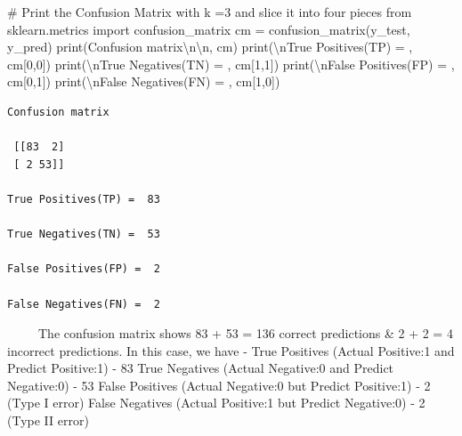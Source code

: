 \documentclass[
  letterpaper,
  DIV=11,
  numbers=noendperiod]{scrreprt}
\newenvironment{Shaded}{\begin{snugshade}}{\end{snugshade}}
\newcommand{\BuiltInTok}[1]{\textcolor[rgb]{0.00,0.23,0.31}{#1}}
\newcommand{\CharTok}[1]{\textcolor[rgb]{0.13,0.47,0.30}{#1}}
\newcommand{\CommentTok}[1]{\textcolor[rgb]{0.37,0.37,0.37}{#1}}
\newcommand{\DecValTok}[1]{\textcolor[rgb]{0.68,0.00,0.00}{#1}}
\newcommand{\ImportTok}[1]{\textcolor[rgb]{0.00,0.46,0.62}{#1}}
\newcommand{\NormalTok}[1]{\textcolor[rgb]{0.00,0.23,0.31}{#1}}
\newcommand{\OperatorTok}[1]{\textcolor[rgb]{0.37,0.37,0.37}{#1}}
\newcommand{\StringTok}[1]{\textcolor[rgb]{0.13,0.47,0.30}{#1}}
\begin{document}
\begin{Shaded}
\begin{Highlighting}[]
\CommentTok{\# Print the Confusion Matrix with k =3 and slice it into four pieces}
\ImportTok{from}\NormalTok{ sklearn.metrics }\ImportTok{import}\NormalTok{ confusion\_matrix}
\NormalTok{cm }\OperatorTok{=}\NormalTok{ confusion\_matrix(y\_test, y\_pred)}
\BuiltInTok{print}\NormalTok{(}\StringTok{\textquotesingle{}Confusion matrix}\CharTok{\textbackslash{}n\textbackslash{}n}\StringTok{\textquotesingle{}}\NormalTok{, cm)}
\BuiltInTok{print}\NormalTok{(}\StringTok{\textquotesingle{}}\CharTok{\textbackslash{}n}\StringTok{True Positives(TP) = \textquotesingle{}}\NormalTok{, cm[}\DecValTok{0}\NormalTok{,}\DecValTok{0}\NormalTok{])}
\BuiltInTok{print}\NormalTok{(}\StringTok{\textquotesingle{}}\CharTok{\textbackslash{}n}\StringTok{True Negatives(TN) = \textquotesingle{}}\NormalTok{, cm[}\DecValTok{1}\NormalTok{,}\DecValTok{1}\NormalTok{])}
\BuiltInTok{print}\NormalTok{(}\StringTok{\textquotesingle{}}\CharTok{\textbackslash{}n}\StringTok{False Positives(FP) = \textquotesingle{}}\NormalTok{, cm[}\DecValTok{0}\NormalTok{,}\DecValTok{1}\NormalTok{])}
\BuiltInTok{print}\NormalTok{(}\StringTok{\textquotesingle{}}\CharTok{\textbackslash{}n}\StringTok{False Negatives(FN) = \textquotesingle{}}\NormalTok{, cm[}\DecValTok{1}\NormalTok{,}\DecValTok{0}\NormalTok{])}
\end{Highlighting}
\end{Shaded}

\begin{verbatim}
Confusion matrix

 [[83  2]
 [ 2 53]]

True Positives(TP) =  83

True Negatives(TN) =  53

False Positives(FP) =  2

False Negatives(FN) =  2
\end{verbatim}

~~~~~The confusion matrix shows 83 + 53 = 136 correct predictions \& 2 +
2 = 4 incorrect predictions. In this case, we have - True Positives
(Actual Positive:1 and Predict Positive:1) - 83 True Negatives (Actual
Negative:0 and Predict Negative:0) - 53 False Positives (Actual
Negative:0 but Predict Positive:1) - 2 (Type I error) False Negatives
(Actual Positive:1 but Predict Negative:0) - 2 (Type II error)
\end{document}
